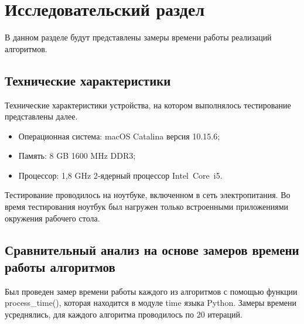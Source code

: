 \chapter{Исследовательский раздел}\label{sec:exp}

В данном разделе будут представлены замеры времени работы реализаций алгоритмов.

\section{Технические характеристики}

Технические характеристики устройства, на котором выполнялось тестирование представлены далее.

\begin{itemize}
    \item Операционная система: macOS Catalina версия 10.15.6;
    \item Память: 8 GB 1600 MHz DDR3;
    \item Процессор: 1,8 GHz 2‑ядерный процессор Intel Core i5.
\end{itemize}

Тестирование проводилось на ноутбуке, включенном в сеть электропитания.
Во время тестирования ноутбук был нагружен только встроенными приложениями окружения рабочего стола.

\section{Сравнительный анализ на основе замеров времени работы алгоритмов}

Был проведен замер времени работы каждого из алгоритмов с помощью функции process\_time(), которая находится в модуле time языка Python.
Замеры времени усреднялись, для каждого алгоритма проводилось по 20 итераций.

